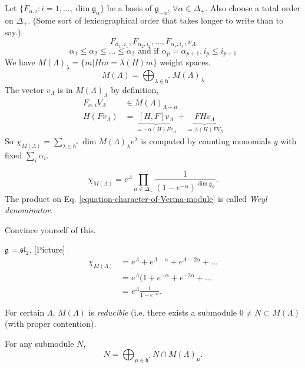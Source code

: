 Let $\{F_{\alpha,i}:i = 1,\ldots, \dim
\mathfrak{g}_\alpha\}$ be a basis of
$\mathfrak{g}_{-\alpha}$, $\forall \alpha \in
\Delta_+$.
Also choose a total order on $\Delta_+$.
(Some sort of lexicographical order
that takes longer to write than to say.)
$$
F_{\alpha_1,i_1},F_{\alpha_2,i_2},\ldots,
F_{\alpha_s,i_s},v_\Lambda
$$
$$
\alpha_1\leq \alpha_2\leq \ldots \leq
\alpha_2\text{ and if }
\alpha_p=\alpha_{p+1}, i_p \leq  i_{p+1}
$$
We have
$M(\Lambda)_\lambda=\{m|Hm=\lambda(H)m\}$
weight spaces.
$$
M(\Lambda)=\bigoplus_{\lambda \in
\mathfrak{h}^*}M(\Lambda)_\lambda
$$
The vector $v_{\Lambda}$ is in
$M(\Lambda)_\Lambda$ by definition,
$$
\begin{aligned}
F_{\alpha,i}V_\Lambda &\in
M(\Lambda)_{\Lambda-\alpha}\\
H(Fv_\Lambda)&=\underbrace{[H,F]v_\Lambda}_{=
-\alpha(H)Fv_\Lambda}
+\underbrace{FHv_\Lambda}_{=\Lambda(H)
FV_\Lambda}
\end{aligned}
$$
So $\chi_{M(\Lambda)}=\sum_{\lambda \in
\mathfrak{h}^*}\dim M(\Lambda)_\lambda
e^{\lambda}$
is computed by counting monomials $y$ with
fixed $\sum_{i}\alpha_i$.

\begin{equation}
\label{equation-character-of-Verma-module}
\chi_{M(\Lambda)}=e^{\Lambda}\prod_{\alpha
\in \Delta_+}
\frac{1}{(1-e^{-\alpha})^{\dim
\mathfrak{g}_\alpha}}.
\end{equation}
The product on Eq.
\ref{equation-character-of-Verma-module} is
called
{\it Weyl denominator}.
\begin{exercise}
\label{exercise-convince-yourself}
Convince yourself of this.
\end{exercise}

\begin{example}
\label{example-sl2-character}
$\mathfrak{g}=\mathfrak{sl}_2$, [Picture]
$$
\begin{aligned}
\chi_{M(\Lambda)}&=e^{\Lambda}+e^{\Lambda-
\alpha}+e^{\Lambda-2\alpha}+\ldots\\
&=e^{\Lambda}(1+e^{-\alpha}+e^{-2\alpha}+
\ldots\\
&=e^{\Lambda}\frac{1}{1-e^{-\alpha}}.
\end{aligned}
$$
\end{example}

\medskip\noindent
For certain $\Lambda$, $M(\Lambda)$ is {\it
reducible} (i.e. there exists
a submodule $0 \neq N \subset M(\Lambda)$
(with proper contention).

\begin{lemma}
\label{lemma-}
For any submodule $N$,
$$
N=\bigoplus_{\mu \in \mathfrak{h}^*}N \cap
M(\Lambda)_\mu.
$$
\end{lemma}

